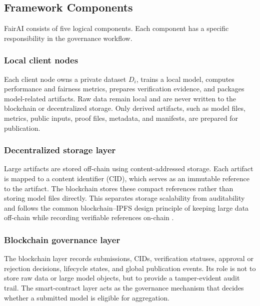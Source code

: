 \documentclass[futureinternet,article,submit,pdftex,moreauthors]{Definitions/mdpi}
\begin{document}
\subsection{Framework Components}
\label{subsec:framework-components}

FairAI consists of five logical components. Each component has a specific responsibility in the governance workflow.

\subsubsection{Local client nodes}

Each client node owns a private dataset \(D_i\), trains a local model, computes performance and fairness metrics, prepares verification evidence, and packages model-related artifacts. Raw data remain local and are never written to the blockchain or decentralized storage. Only derived artifacts, such as model files, metrics, public inputs, proof files, metadata, and manifests, are prepared for publication.

\subsubsection{Decentralized storage layer}

Large artifacts are stored off-chain using content-addressed storage. Each artifact is mapped to a content identifier (CID), which serves as an immutable reference to the artifact. The blockchain stores these compact references rather than storing model files directly. This separates storage scalability from auditability and follows the common blockchain--IPFS design principle of keeping large data off-chain while recording verifiable references on-chain \cite{intro_8,rw_21}.

\subsubsection{Blockchain governance layer}

The blockchain layer records submissions, CIDs, verification statuses, approval or rejection decisions, lifecycle states, and global publication events. Its role is not to store raw data or large model objects, but to provide a tamper-evident audit trail. The smart-contract layer acts as the governance mechanism that decides whether a submitted model is eligible for aggregation.
\end{document}
